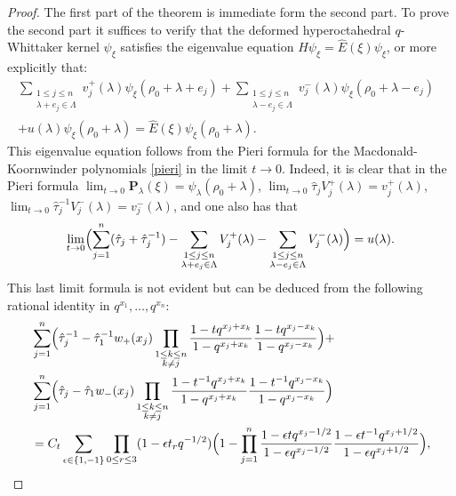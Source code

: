 \documentclass[reqno]{amsart}
\theoremstyle{remark}
\numberwithin{equation}{section}
\begin{document}
\begin{proof}
The first part  of the theorem is immediate form the second part. To prove the second part
it suffices to verify that the deformed hyperoctahedral $q$-Whittaker kernel $\psi_\xi$ satisfies
the eigenvalue equation
$H\psi_\xi=\hat{E}(\xi)\psi_\xi$, or more explicitly that:
\begin{align*}
\sum_{\substack{1\leq j\leq n\\ \lambda +e_j\in\Lambda}} v_j^+(\lambda) \psi_\xi (\rho_0+\lambda +e_j)+ \sum_{\substack{1\leq j\leq n\\ \lambda -e_j\in\Lambda}}v_j^-(\lambda) \psi_\xi (\rho_0+\lambda -e_j) & \\
+u(\lambda )\psi_\xi (\rho_0+\lambda) 
=\hat{E}(\xi)\psi_\xi (\rho_0+\lambda) .& \nonumber
\end{align*}
This eigenvalue equation follows from the Pieri formula for the Macdonald-Koornwinder polynomials \eqref{pieri} in the limit $t\to 0$. Indeed, it is clear that in the Pieri formula
$\lim_{t\to 0} \mathbf{P}_\lambda (\xi)=\psi_\lambda (\rho_0+\lambda )$,
$\lim_{t\to 0} \hat{\tau}_jV^+_j(\lambda)=v_j^+(\lambda)$, $\lim_{t\to 0} \hat{\tau}_j^{-1}V^-_j(\lambda)=v_j^-(\lambda)$, and one also has that
\begin{equation*}\label{limit}
 \lim_{t\to 0} \Bigl( \sum_{j=1}^n (\hat{\tau}_j+\hat{\tau}_j^{-1})-
\sum_{\substack{1\leq j\leq n\\ \lambda +e_j\in\Lambda}}
V_j^+(\lambda) 
-\sum_{\substack{1\leq j\leq n\\ \lambda -e_j\in\Lambda}}
V_j^-(\lambda)  \Bigr) = u(\lambda) .
\end{equation*}
This last limit formula is not evident
but can be deduced from the following rational identity in $q^{x_1},\ldots, q^{x_n}$:
\begin{align*}
&\sum_{j=1}^n\Bigl( \hat{\tau}_j^{-1}-  \hat{\tau}_1^{-1}w_+(x_j) \prod_{\substack{1\leq k\leq n\\k\neq j}}
\frac{1-tq^{x_j+x_k}}{1-q^{x_j+x_k}}
\frac{1-tq^{x_j-x_k}}{1-q^{x_j-x_k}} \Bigr) +\\
&\sum_{j=1}^n  \Bigl( \hat{\tau}_j- \hat{\tau}_1w_-(x_j) 
\prod_{\substack{1\leq k\leq n\\k\neq j}}
\frac{1-t^{-1}q^{x_j+x_k}}{1-q^{x_j+x_k}}
\frac{1-t^{-1}q^{x_j-x_k}}{1-q^{x_j-x_k}} \Bigr) \nonumber \\
&=C_t\sum_{\epsilon \in \{ 1,-1\}}  \prod_{0\leq r\leq 3}(1-\epsilon t_rq^{-1/2}) \Bigl( 1-\prod_{j=1}^n
\frac{1-\epsilon t q^{x_j-1/2}}{1-\epsilon q^{x_j-1/2}}
\frac{1-\epsilon t^{-1} q^{x_j+1/2}}{1-\epsilon q^{x_j+1/2}} \Bigr) , \nonumber

\end{align*}
\end{proof}
\end{document}
